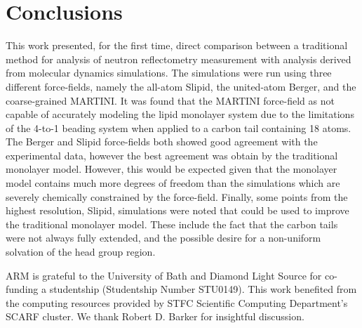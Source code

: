 \documentclass[amsmath,amssymb,twocolumn,superscriptaddress,aps,prl]{revtex4-1}
\begin{document}
\section{Conclusions}
This work presented, for the first time, direct comparison between a traditional method for analysis of neutron reflectometry measurement with analysis derived from molecular dynamics simulations.
The simulations were run using three different force-fields, namely the all-atom Slipid, the united-atom Berger, and the coarse-grained MARTINI. 
It was found that the MARTINI force-field as not capable of accurately modeling the lipid monolayer system due to the limitations of the 4-to-1 beading system when applied to a carbon tail containing 18 atoms. 
The Berger and Slipid force-fields both showed good agreement with the experimental data, however the best agreement was obtain by the traditional monolayer model. 
However, this would be expected given that the monolayer model contains much more degrees of freedom than the simulations which are severely chemically constrained by the force-field. 
Finally, some points from the highest resolution, Slipid, simulations were noted that could be used to improve the traditional monolayer model. 
These include the fact that the carbon tails were not always fully extended, and the possible desire for a non-uniform solvation of the head group region. 

\begin{acknowledgements}
ARM is grateful to the University of Bath and Diamond Light Source for co-funding a studentship (Studentship Number STU0149). This work benefited from the computing resources provided by STFC Scientific Computing Department's SCARF cluster. We thank Robert D. Barker for insightful discussion.
\end{acknowledgements}


\end{document}
